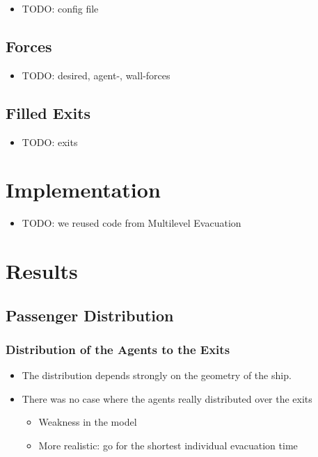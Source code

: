 \documentclass{beamer}
\begin{document}
\begin{frame}
	\begin{itemize}
		\item TODO: config file
	\end{itemize}
\end{frame}

\subsection{Forces}
\begin{frame}
	\begin{itemize}
		\item TODO: desired, agent-, wall-forces
	\end{itemize}
\end{frame}

\subsection{Filled Exits}
\begin{frame}
	\begin{itemize}
		\item TODO: exits
	\end{itemize}
\end{frame}

\section{Implementation}

\begin{frame}
	\begin{itemize}
		\item TODO: we reused code from Multilevel Evacuation
	\end{itemize}
\end{frame}

\section{Results}

\subsection{Passenger Distribution}
\begin{frame}
	\frametitle{Distribution of the Agents to the Exits}
	\begin{itemize}
		\item The distribution depends strongly on the geometry of the ship.
		\item There was no case where the agents really distributed over the exits
		\begin{itemize}
			\item Weakness in the model
			\item More realistic: go for the shortest individual evacuation time
		\end{itemize}
	\end{itemize}
\end{frame}
\end{document}
